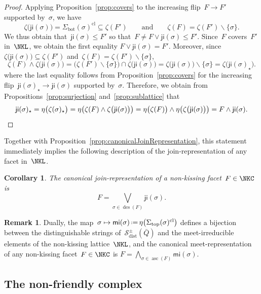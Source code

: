 \documentclass{amsart}
\newtheorem{corollary}[theorem]{Corollary}
\theoremstyle{definition}
\newtheorem{remark}[theorem]{Remark}
\newcommand{\ssm}{\smallsetminus} %
\newcommand{\eqdef}{\mbox{\,\raisebox{0.2ex}{\scriptsize\ensuremath{\mathrm:}}\ensuremath{=}\,}} %
\DeclareMathOperator{\ascents}{asc} %
\DeclareMathOperator{\descents}{des} %
\newcommand{\distinguishableStrings}{\mathcal{S}_\mathrm{dist}} %
\renewcommand{\top}{\mathrm{top}} %
\newcommand{\bottom}{\mathrm{bot}} %
\newcommand{\meet}{\wedge} %
\newcommand{\join}{\vee} %
\newcommand{\bigMeet}{\bigwedge} %
\newcommand{\bigJoin}{\bigvee} %
\newcommand{\closure}[1]{#1^{\mathrm{cl}}} %
\newcommand{\ji}{\mathsf{ji}} %
\newcommand{\mi}{\mathsf{mi}} %
\begin{document}
\begin{proof}
Applying Proposition~\ref{prop:covers} to the increasing flip~$F \to F'$ supported by~$\sigma$, we have
\[
\zeta \big( \ji(\sigma) \big) = \closure{\Sigma_\bottom(\sigma)} \subseteq \zeta(F')
\qquad\text{and}\qquad
\zeta(F) = \zeta(F') \ssm \{\sigma\}.
\]
%
We thus obtain that~$\ji(\sigma) \le F'$ so that~$F \ne F \join \ji(\sigma) \le F'$. Since~$F$ covers~$F'$ in~$\NKL$, we obtain the first equality
\(
F \join \ji(\sigma) = F'.
\)
%
Moreover, since~$\zeta \big( \ji(\sigma) \big) \subseteq \zeta(F')$ and~$\zeta(F) = \zeta(F') \ssm \{\sigma\}$, %
\[
\zeta(F) \meet \zeta \big( \ji(\sigma) \big) = \big( \zeta(F') \ssm \{\sigma\} \big) \cap \zeta \big( \ji(\sigma) \big) = \zeta \big( \ji(\sigma) \big) \ssm \{\sigma\} = \zeta \big( \ji(\sigma)_\star \big).
\]
where the last equality follows from Proposition~\ref{prop:covers} for the increasing flip~$\ji(\sigma)_\star \to \ji(\sigma)$ supported by~$\sigma$.
Therefore, we obtain from Propositions~\ref{prop:surjection} and~\ref{prop:sublattice} that
\[
\ji(\sigma)_\star
= \eta \big( \zeta(\sigma)_\star \big)
= \eta \big( \zeta(F) \meet \zeta \big( \ji(\sigma) \big) \big)
= \eta \big( \zeta(F) \big) \meet \eta \big( \zeta \big( \ji(\sigma) \big) \big)
= F \meet \ji(\sigma).
\qedhere
\]
\end{proof}

Together with Proposition~\ref{prop:canonicalJoinRepresentation}, this statement immediately implies the following description of the join-representation of any facet in~$\NKL$.

\begin{corollary}
\label{coro:joinRepresentations}
The canonical join-representation of a non-kissing facet~$F \in \NKC$ is
\[
F = \bigJoin_{\sigma \in \descents(F)} \ji(\sigma).
\]
\end{corollary}

\begin{remark}
Dually, the map~$\sigma \mapsto \mi(\sigma) \eqdef \eta \big( \closure{\Sigma_\top(\sigma)} \big)$ defines a bijection between the distinguishable strings of~$\distinguishableStrings^\pm(\bar Q)$ and the meet-irreducible elements of the non-kissing lattice~$\NKL$, and the canonical meet-representation of any non-kissing facet~$F \in \NKC$ is $F = \bigMeet_{\sigma \in \ascents(F)} \mi(\sigma)$.
\end{remark}

\subsection{The non-friendly complex}
\label{subsec:nonFriendlyComplex}
\end{document}
